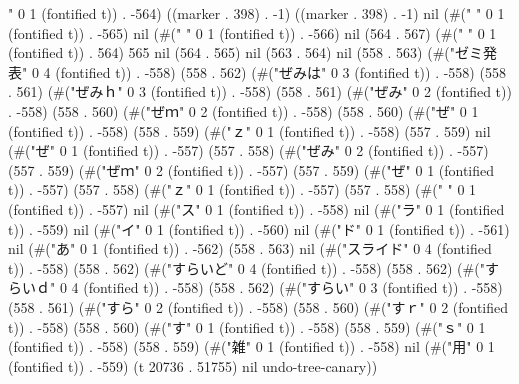 " 0 1 (fontified t)) . -564) ((marker . 398) . -1) ((marker . 398) . -1) nil (#(" " 0 1 (fontified t)) . -565) nil (#(" " 0 1 (fontified t)) . -566) nil (564 . 567) (#(" " 0 1 (fontified t)) . 564) 565 nil (564 . 565) nil (563 . 564) nil (558 . 563) (#("ゼミ発表" 0 4 (fontified t)) . -558) (558 . 562) (#("ぜみは" 0 3 (fontified t)) . -558) (558 . 561) (#("ぜみｈ" 0 3 (fontified t)) . -558) (558 . 561) (#("ぜみ" 0 2 (fontified t)) . -558) (558 . 560) (#("ぜｍ" 0 2 (fontified t)) . -558) (558 . 560) (#("ぜ" 0 1 (fontified t)) . -558) (558 . 559) (#("ｚ" 0 1 (fontified t)) . -558) (557 . 559) nil (#("ぜ" 0 1 (fontified t)) . -557) (557 . 558) (#("ぜみ" 0 2 (fontified t)) . -557) (557 . 559) (#("ぜｍ" 0 2 (fontified t)) . -557) (557 . 559) (#("ぜ" 0 1 (fontified t)) . -557) (557 . 558) (#("ｚ" 0 1 (fontified t)) . -557) (557 . 558) (#(" " 0 1 (fontified t)) . -557) nil (#("ス" 0 1 (fontified t)) . -558) nil (#("ラ" 0 1 (fontified t)) . -559) nil (#("イ" 0 1 (fontified t)) . -560) nil (#("ド" 0 1 (fontified t)) . -561) nil (#("あ" 0 1 (fontified t)) . -562) (558 . 563) nil (#("スライド" 0 4 (fontified t)) . -558) (558 . 562) (#("すらいど" 0 4 (fontified t)) . -558) (558 . 562) (#("すらいｄ" 0 4 (fontified t)) . -558) (558 . 562) (#("すらい" 0 3 (fontified t)) . -558) (558 . 561) (#("すら" 0 2 (fontified t)) . -558) (558 . 560) (#("すｒ" 0 2 (fontified t)) . -558) (558 . 560) (#("す" 0 1 (fontified t)) . -558) (558 . 559) (#("ｓ" 0 1 (fontified t)) . -558) (558 . 559) (#("雑" 0 1 (fontified t)) . -558) nil (#("用" 0 1 (fontified t)) . -559) (t 20736 . 51755) nil undo-tree-canary))
